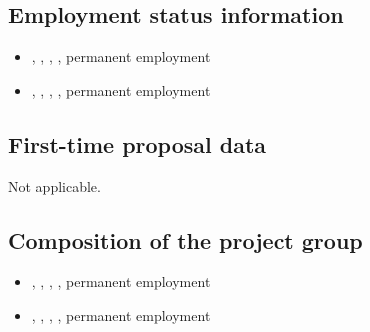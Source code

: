 \subsection{Employment status information}

\begin{itemize}\setlength{\itemsep}{0pt}
	\item {\bfseries \GroupAProf}, \GroupAlg, \GroupAUniversity,  \GroupBEmployment, permanent employment
	\item {\bfseries \GroupBProf}, \GroupBlg, \GroupBUniversity,  \GroupAEmployment, permanent employment
\end{itemize}

\subsection{First-time proposal data}
Not applicable.


\subsection{Composition of the project group}

\begin{itemize}\setlength{\itemsep}{0pt}
	\item {\bfseries \GroupAProf}, \GroupAlg, \GroupAUniversity,  \GroupBEmployment, permanent employment
	\item {\bfseries \GroupBProf}, \GroupBlg, \GroupBUniversity,  \GroupAEmployment, permanent employment
\end{itemize}

